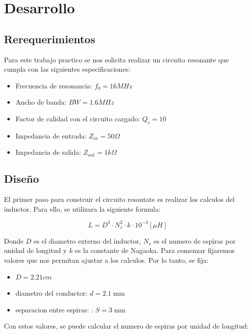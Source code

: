 \section{Desarrollo}

\subsection{Rerequerimientos}

Para este trabajo practico se nos solicita realizar un circuito resonante que cumpla con las siguientes especificaciones:

\begin{itemize}
    \item Frecuencia de resonancia: $f_0 = 16 MHz$
    \item Ancho de banda: $BW = 1.6 MHz$
    \item Factor de calidad con el circuito cargado: $Q_c = 10$
    \item Impedancia de entrada: $Z_{in} = 50 \Omega$
    \item Impedancia de salida: $Z_{out} = 1 k\Omega$
\end{itemize}

\subsection{Diseño}

El primer paso para construir el circuito resontate es realizar los calculos del inductor. Para ello, se utilizara la siguiente formula:

\begin{equation}
    L = D^3 \cdot N_s^2 \cdot k \cdot 10^{-3} [\mu H]
\end{equation}

Donde $D$ es el diametro externo del inductor, $N_s$ es el numero de espiras por unidad de longitud y $k$ es la constante de Nagaoka. 
Para comenzar fijaremos valores que nos permitan ajustar a los calculos. Por lo tanto, se fija:

\begin{itemize}
    \item $D =  2.21 cm$
    \item diametro del conductor: $d = 2.1\; \text{mm}$
    \item separacion entre espiras: : $S = 3\; \text{mm}$
\end{itemize}

Con estos valores, se puede calcular el numero de espiras por unidad de longitud:

